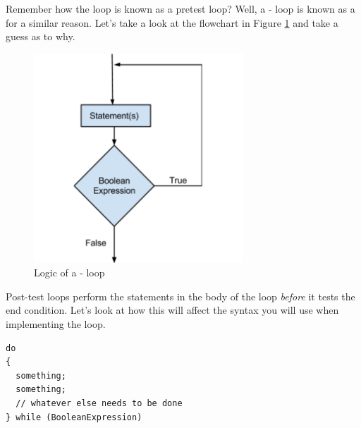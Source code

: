 \noindent{}

\noindent{}

\noindent{}

\noindent{}

\noindent{}

\noindent{}

\noindent{}

\noindent{}

\noindent{}

\noindent{}


Remember how the  loop is known as a pretest loop?
Well, a - loop is known as a  for a similar reason.
Let's take a look at the flowchart in Figure \ref{fig-do-while-logic} and take a guess as to why.

\begin{figure}[tbh]
  \centering
  \includegraphics[width=0.7\textwidth]{diagrams/do_while_logic.pdf}
  \caption{Logic of a - loop} \label{fig-do-while-logic} 
\end{figure}

Post-test loops perform the statements in the body of the loop \emph{before} it tests the end condition.
Let's look at how this will affect the syntax you will use when implementing the loop.

\noindent\begin{minipage}{\linewidth}\begin{lstlisting}
do
{
  something;
  something;
  // whatever else needs to be done
} while (BooleanExpression)
\end{lstlisting}\end{minipage}

